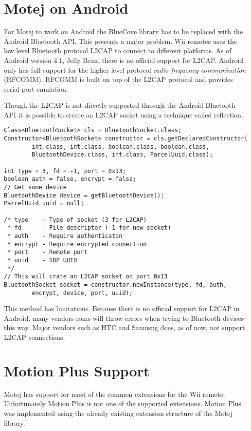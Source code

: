 \section{Motej on Android}

For Motej to work on Android the BlueCove library has to be replaced with the Android Bluetooth API. This presents a major problem. Wii  remotes uses the low level Bluetooth protocol L2CAP to connect to different platforms. As of Android version 4.1, Jelly Bean, \cite{jellyBean} there is no official support for L2CAP. Android only has full support for the higher level protocol \emph{radio frequency communication} (RFCOMM). RFCOMM is built on top of the L2CAP protocol and provides serial port emulation. 

Though the L2CAP is not directly supported through the Android Bluetooth API it is possible to create an L2CAP socket using a technique called reflection.

\begin{lstlisting}
Class<BluetoothSocket> cls = BluetoothSocket.class;
Constructor<BluetoothSocket> constructor = cls.getDeclaredConstructor(
		int.class, int.class, boolean.class, boolean.class,
		BluetoothDevice.class, int.class, ParcelUuid.class);

int type = 3, fd = -1, port = 0x13;
boolean auth = false, encrypt = false;
// Get some device
BluetoothDevice device = getBluetoothDevice();
ParcelUuid uuid = null;

/* type    - Type of socket (3 for L2CAP)
 * fd      - File descriptor (-1 for new socket)
 * auth    - Require authenticaton
 * encrypt - Require encrypted connection
 * port    - Remote port
 * uuid	   - SDP UUID
 */
// This will crate an L2CAP socket on port 0x13
BluetoothSocket socket = constructor.newInstance(type, fd, auth,
		encrypt, device, port, uuid);
\end{lstlisting}

This method has limitations. Because there is no official support for L2CAP in Android, many vendors roms will throw errors when trying to Bluetooth devices this way. Major vendors such as HTC and Samusng does, as of now, not support L2CAP connections.

\section{Motion Plus Support}
Motej has support for most of the common extensions for the Wii remote. Unfortunately Motion Plus is not one of the supported extensions. Motion Plus was implemented using the already existing extension structure of the Motej library.

